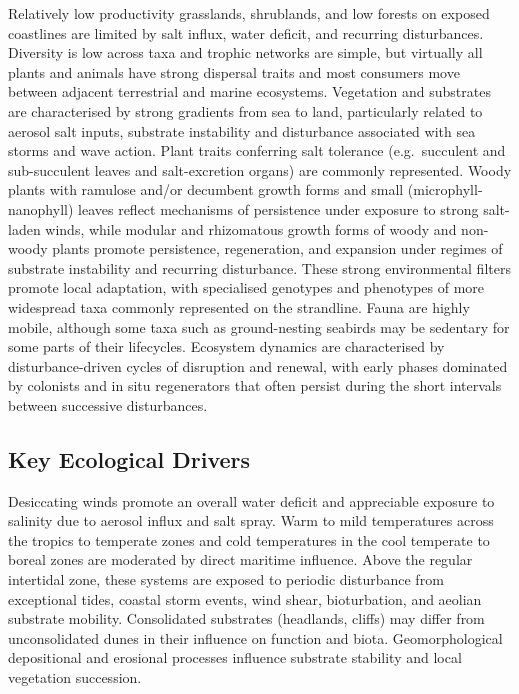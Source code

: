 \documentclass[
  letterpaper,
  DIV=11,
  numbers=noendperiod]{scrartcl}
\begin{document}
Relatively low productivity grasslands, shrublands, and low forests on
exposed coastlines are limited by salt influx, water deficit, and
recurring disturbances. Diversity is low across taxa and trophic
networks are simple, but virtually all plants and animals have strong
dispersal traits and most consumers move between adjacent terrestrial
and marine ecosystems. Vegetation and substrates are characterised by
strong gradients from sea to land, particularly related to aerosol salt
inputs, substrate instability and disturbance associated with sea storms
and wave action. Plant traits conferring salt tolerance (e.g.~succulent
and sub-succulent leaves and salt-excretion organs) are commonly
represented. Woody plants with ramulose and/or decumbent growth forms
and small (microphyll-nanophyll) leaves reflect mechanisms of
persistence under exposure to strong salt-laden winds, while modular and
rhizomatous growth forms of woody and non-woody plants promote
persistence, regeneration, and expansion under regimes of substrate
instability and recurring disturbance. These strong environmental
filters promote local adaptation, with specialised genotypes and
phenotypes of more widespread taxa commonly represented on the
strandline. Fauna are highly mobile, although some taxa such as
ground-nesting seabirds may be sedentary for some parts of their
lifecycles. Ecosystem dynamics are characterised by disturbance-driven
cycles of disruption and renewal, with early phases dominated by
colonists and in situ regenerators that often persist during the short
intervals between successive disturbances.

\subsection{Key Ecological Drivers}\label{key-ecological-drivers-56}

Desiccating winds promote an overall water deficit and appreciable
exposure to salinity due to aerosol influx and salt spray. Warm to mild
temperatures across the tropics to temperate zones and cold temperatures
in the cool temperate to boreal zones are moderated by direct maritime
influence. Above the regular intertidal zone, these systems are exposed
to periodic disturbance from exceptional tides, coastal storm events,
wind shear, bioturbation, and aeolian substrate mobility. Consolidated
substrates (headlands, cliffs) may differ from unconsolidated dunes in
their influence on function and biota. Geomorphological depositional and
erosional processes influence substrate stability and local vegetation
succession.
\end{document}
